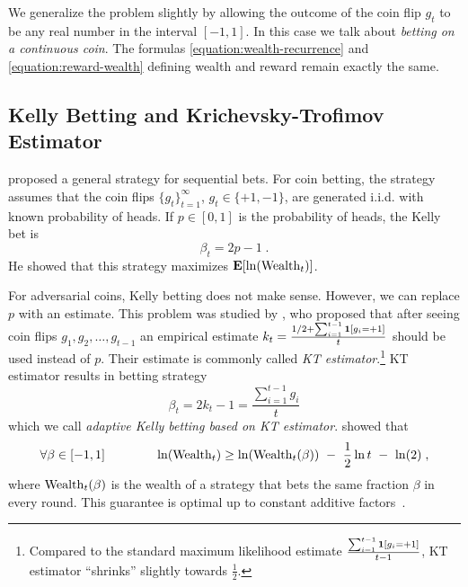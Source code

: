 We generalize the problem slightly by allowing the outcome of the coin flip
$g_t$ to be any real number in the interval $[-1,1]$. In this case we talk about
\emph{betting on a continuous coin}. The formulas
\eqref{equation:wealth-recurrence} and \eqref{equation:reward-wealth} defining
wealth and reward remain exactly the same.

\subsection{Kelly Betting and Krichevsky-Trofimov Estimator}

\citet{Kelly56} proposed a general strategy for sequential bets. For coin
betting, the strategy assumes that the coin flips $\{g_t\}_{t=1}^\infty$, $g_t
\in \{+1,-1\}$, are generated i.i.d. with known probability of heads. If $p \in
[0,1]$ is the probability of heads, the Kelly bet is
$$
\beta_t = 2p - 1 \; .
$$
He showed that this strategy maximizes $\operatorname*{\mathbf{E}}[\ln(\operatorname{Wealth}_t)]$.

For adversarial coins, Kelly betting does not make sense. However, we can
replace $p$ with an estimate. This problem was studied by \citet{KrichevskyT81},
who proposed that after seeing coin flips $g_1, g_2, \dots, g_{t-1}$ an
empirical estimate $k_t = \frac{1/2 + \sum_{i=1}^{t-1} \mathbf{1}[g_i = +1]}{t}$
should be used instead of $p$. Their estimate is commonly called \emph{KT
estimator}.\footnote{Compared to the standard maximum likelihood estimate
$\frac{\sum_{i=1}^{t-1} \mathbf{1}[g_i = +1]}{t-1}$, KT estimator ``shrinks''
slightly towards $\frac{1}{2}$.} KT estimator results in betting strategy
\begin{equation}
\label{equation:kt-estimator-betting-strategy}
\beta_t = 2k_t - 1 = \frac{\sum_{i=1}^{t-1} g_i}{t}
\end{equation}
which we call \emph{adaptive Kelly betting based on KT estimator}.
\citeauthor{KrichevskyT81} showed that
$$
\forall \beta \in [-1,1] \qquad \qquad \ln(\Wealth_t) \ge \ln(\Wealth_t(\beta)) \ - \ \frac{1}{2} \ln t \ - \ \ln(2) \; ,
$$
where $\operatorname{Wealth}_t(\beta)$ is the wealth of a strategy that bets the same fraction
$\beta$ in every round. This guarantee is optimal up to constant additive factors~\citep{Cesa-BianchiL06}.

